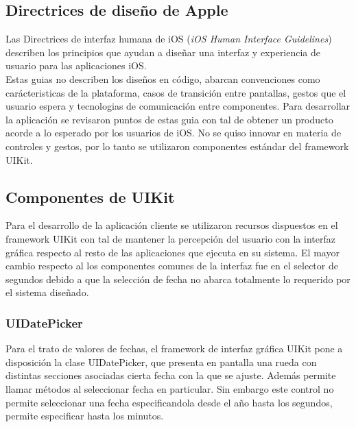   \subsection{Directrices de diseño de Apple}

Las Directrices de interfaz humana de iOS (\textit{iOS Human Interface Guidelines}) describen los principios que ayudan a diseñar una interfaz y experiencia de usuario para las aplicaciones iOS.\\

Estas guias no describen los diseños en código, abarcan convenciones como carácteristicas de la plataforma, casos de transición entre pantallas, gestos que el usuario espera y tecnologias de comunicación entre componentes.
Para desarrollar la aplicación se revisaron puntos de estas guia con tal de obtener un producto acorde a lo esperado por los usuarios de iOS. No se quiso innovar en materia de controles y gestos, por lo tanto se utilizaron componentes estándar del framework UIKit.
	
	\subsection{Componentes de UIKit}
	Para el desarrollo de la aplicación cliente se utilizaron recursos dispuestos en el framework UIKit con tal de mantener la percepción del usuario con la interfaz gráfica respecto al resto de las aplicaciones que ejecuta en su sistema. El mayor cambio respecto al los componentes comunes de la interfaz fue en el selector de segundos debido a que la selección de fecha no abarca totalmente lo requerido por el sistema diseñado.
	
		\subsubsection{UIDatePicker}
Para el trato de valores de fechas, el framework de interfaz gráfica UIKit pone a disposición la clase UIDatePicker, que presenta en pantalla una rueda con distintas secciones asociadas cierta fecha con la que se ajuste. Además permite llamar métodos al seleccionar fecha en particular. Sin embargo este control no permite seleccionar una fecha especificandola desde el año hasta los segundos, permite especificar hasta los minutos. \\

